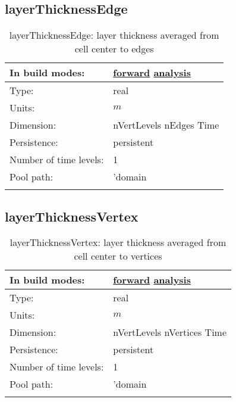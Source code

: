 \subsection[layerThicknessEdge]{layerThicknessEdge}
\label{subsec:var_sec_diagnostics_layerThicknessEdge}
\begin{center}
\begin{longtable}{| p{2.0in} | p{4.0in} |}
        \hline 
        In build modes: & \hyperref[subsec:forward_var_tab_diagnostics]{forward} \hyperref[subsec:analysis_var_tab_diagnostics]{analysis} \\
        \hline 
        Type: & real \\
        \hline 
        Units: & $m$ \\
        \hline 
        Dimension: & nVertLevels nEdges Time \\
        \hline 
        Persistence: & persistent \\
        \hline 
        Number of time levels: & 1 \\
        \hline 
            Pool path: & 'domain %
 \\
		 \hline 
    \caption{layerThicknessEdge: layer thickness averaged from cell center to edges}
\end{longtable}
\end{center}
\subsection[layerThicknessVertex]{layerThicknessVertex}
\label{subsec:var_sec_diagnostics_layerThicknessVertex}
\begin{center}
\begin{longtable}{| p{2.0in} | p{4.0in} |}
        \hline 
        In build modes: & \hyperref[subsec:forward_var_tab_diagnostics]{forward} \hyperref[subsec:analysis_var_tab_diagnostics]{analysis} \\
        \hline 
        Type: & real \\
        \hline 
        Units: & $m$ \\
        \hline 
        Dimension: & nVertLevels nVertices Time \\
        \hline 
        Persistence: & persistent \\
        \hline 
        Number of time levels: & 1 \\
        \hline 
            Pool path: & 'domain %
 \\
		 \hline 
    \caption{layerThicknessVertex: layer thickness averaged from cell center to vertices}
\end{longtable}
\end{center}
